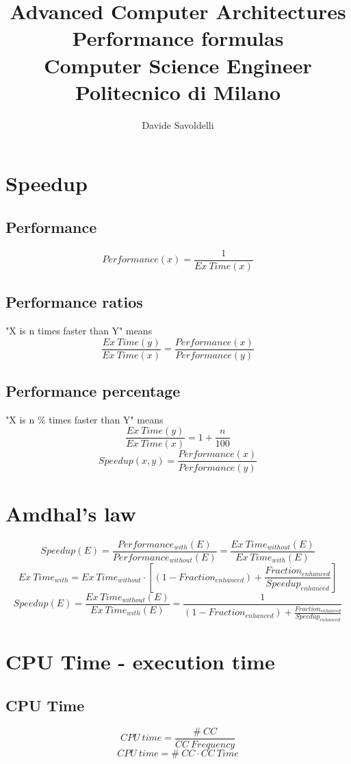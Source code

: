 \documentclass[12pt]{article}
\begin{document}
\title{%
  Advanced Computer Architectures Performance formulas \\
  \large Computer Science Engineer \\
  Politecnico di Milano \\
}

\author{Davide Savoldelli}

\maketitle
\tableofcontents
\newpage
\section{Speedup}        
    \subsection{Performance}
        \[Performance(x) = \frac{1}{Ex\:Time(x)}\]
    \subsection{Performance ratios}
        "X is n times faster than Y" means
        \[\frac{Ex\:Time(y)}{Ex\:Time(x)} = \frac{Performance(x)}{Performance(y)}\]
    \subsection{Performance percentage}
        "X is n \% times faster than Y" means
        \[\frac{Ex\:Time(y)}{Ex\:Time(x)} = 1 + \frac{n}{100}\]
        \[Speedup(x, y) = \frac{Performance(x)}{Performance(y)}\]
\section{Amdhal's law}
    \[Speedup(E) = \frac{Performance_{with}(E)}{Performance_{without}(E)} = \frac{Ex\:Time_{without}(E)}{Ex\:Time_{with}(E)}\]
    \[Ex\:Time_{with} = Ex\:Time_{without}\cdot[(1-Fraction_{enhanced}) + \frac{Fraction_{enhanced}}{Speedup_{enhanced}}]\]
    \[Speedup(E) = \frac{Ex\:Time_{without}(E)}{Ex\:Time_{with}(E)} = \frac{1}{(1-Fraction_{enhanced}) + \frac{Fraction_{enhanced}}{Speedup_{enhanced}}}\]
\newpage
\section{CPU Time - execution time}
    \subsection{CPU Time}
    \[CPU\:time = \frac{\#\:CC}{CC\:Frequency}\]
    \[CPU\:time = \#\:CC \cdot CC\:Time\]
\end{document}
